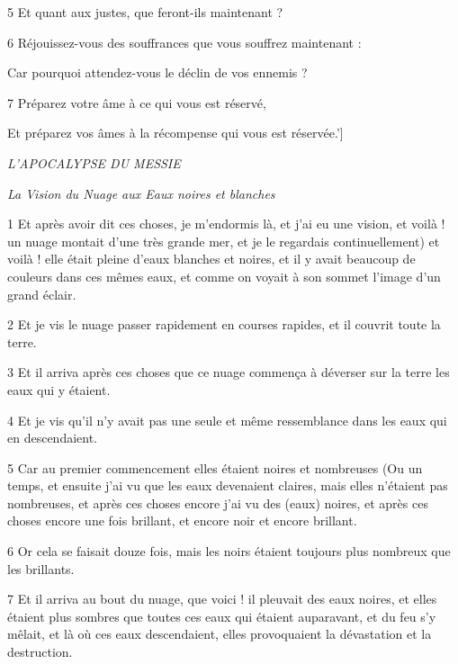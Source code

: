 \par 5 Et quant aux justes, que feront-ils maintenant ?

\par 6 Réjouissez-vous des souffrances que vous souffrez maintenant :

\par Car pourquoi attendez-vous le déclin de vos ennemis ?

\par 7 Préparez votre âme à ce qui vous est réservé,

\par Et préparez vos âmes à la récompense qui vous est réservée.']


\par \textit{L'APOCALYPSE DU MESSIE}

\par \textit{La Vision du Nuage aux Eaux noires et blanches}


\par 1 Et après avoir dit ces choses, je m'endormis là, et j'ai eu une vision, et voilà ! un nuage montait d'une très grande mer, et je le regardais continuellement) et voilà ! elle était pleine d'eaux blanches et noires, et il y avait beaucoup de couleurs dans ces mêmes eaux, et comme on voyait à son sommet l'image d'un grand éclair.

\par 2 Et je vis le nuage passer rapidement en courses rapides, et il couvrit toute la terre.

\par 3 Et il arriva après ces choses que ce nuage commença à déverser sur la terre les eaux qui y étaient.

\par 4 Et je vis qu'il n'y avait pas une seule et même ressemblance dans les eaux qui en descendaient.

\par 5 Car au premier commencement elles étaient noires et nombreuses (Ou un temps, et ensuite j'ai vu que les eaux devenaient claires, mais elles n'étaient pas nombreuses, et après ces choses encore j'ai vu des (eaux) noires, et après ces choses encore une fois brillant, et encore noir et encore brillant.

\par 6 Or cela se faisait douze fois, mais les noirs étaient toujours plus nombreux que les brillants.

\par 7 Et il arriva au bout du nuage, que voici ! il pleuvait des eaux noires, et elles étaient plus sombres que toutes ces eaux qui étaient auparavant, et du feu s'y mêlait, et là où ces eaux descendaient, elles provoquaient la dévastation et la destruction.

